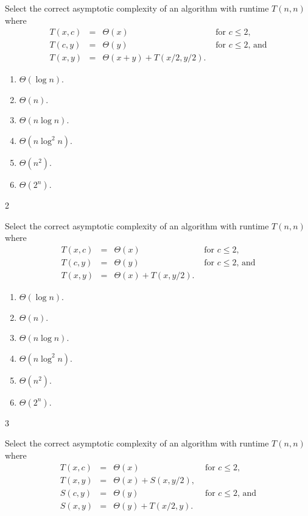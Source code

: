 \documentclass[12pt,twoside]{article}
\begin{document}
\begin{problems}
\begin{problemparts}

\problempart {}
Select the correct asymptotic complexity
of an algorithm with runtime $T(n, n)$
where 
$$
\begin{array}{rcll}
T(x, c) &=& \Theta(x) & \textrm{ for $c \le 2$}, \\
T(c, y) &=& \Theta(y) & \textrm{ for $c \le 2$, and} \\
T(x, y) &=& \Theta(x + y) + T(x / 2, y / 2).
\end{array}
$$

\begin{enumerate}
\item $\Theta(\log n)$.
\item $\Theta(n)$.
\item $\Theta(n \log n)$.
\item $\Theta(n \log^2 n)$.
\item $\Theta(n^2)$.
\item $\Theta(2^n)$.
\end{enumerate}

\ifsolution \solution{}
2
\fi

\problempart {}
Select the correct asymptotic complexity
of an algorithm with runtime $T(n, n)$
where 
$$
\begin{array}{rcll}
T(x, c) &=& \Theta(x) & \textrm{ for $c \le 2$}, \\
T(c, y) &=& \Theta(y) & \textrm{ for $c \le 2$, and} \\
T(x, y) &=& \Theta(x) + T(x, y / 2).
\end{array}
$$

\begin{enumerate}
\item $\Theta(\log n)$.
\item $\Theta(n)$.
\item $\Theta(n \log n)$.
\item $\Theta(n \log^2 n)$.
\item $\Theta(n^2)$.
\item $\Theta(2^n)$.
\end{enumerate}

\ifsolution \solution{}
3
\fi

\problempart {}
Select the correct asymptotic complexity
of an algorithm with runtime $T(n, n)$
where 
$$
\begin{array}{rcll}
T(x, c) &=& \Theta(x) & \textrm{ for $c \le 2$}, \\
T(x, y) &=& \Theta(x) + S(x, y / 2), \\
S(c, y) &=& \Theta(y) & \textrm{ for $c \le 2$, and} \\
S(x, y) &=& \Theta(y) + T(x / 2, y).
\end{array}
$$


\end{problemparts}
\end{problems}
\end{document}
